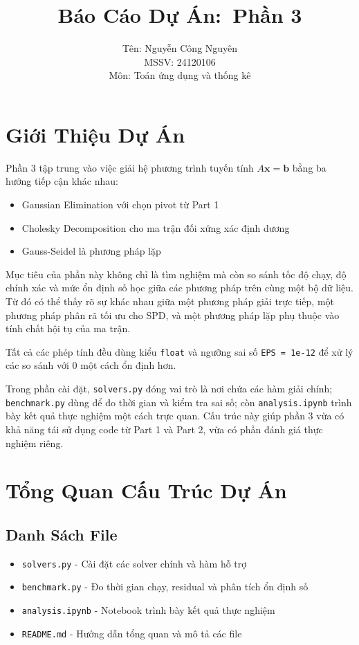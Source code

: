 \documentclass[12pt, a4paper, twoside]{article}
\title{\textbf{Báo Cáo Dự Án:\ \Huge Phần 3}}
\author{Tên: Nguyễn Công Nguyên\\MSSV: 24120106 \\Môn: Toán ứng dụng và thống kê}
\date{\vspace{-5mm}}
\begin{document}
\maketitle

\tableofcontents
\newpage

\section{Giới Thiệu Dự Án}

Phần 3 tập trung vào việc giải hệ phương trình tuyến tính $A\mathbf{x} = \mathbf{b}$ bằng ba hướng tiếp cận khác nhau:
\begin{itemize}
    \item Gaussian Elimination với chọn pivot từ Part 1
    \item Cholesky Decomposition cho ma trận đối xứng xác định dương
    \item Gauss-Seidel là phương pháp lặp
\end{itemize}

Mục tiêu của phần này không chỉ là tìm nghiệm mà còn so sánh tốc độ chạy, độ chính xác và mức ổn định số học giữa các phương pháp trên cùng một bộ dữ liệu. Từ đó có thể thấy rõ sự khác nhau giữa một phương pháp giải trực tiếp, một phương pháp phân rã tối ưu cho SPD, và một phương pháp lặp phụ thuộc vào tính chất hội tụ của ma trận.

Tất cả các phép tính đều dùng kiểu \texttt{float} và ngưỡng sai số \texttt{EPS = 1e-12} để xử lý các so sánh với 0 một cách ổn định hơn.

Trong phần cài đặt, \texttt{solvers.py} đóng vai trò là nơi chứa các hàm giải chính; \texttt{benchmark.py} dùng để đo thời gian và kiểm tra sai số; còn \texttt{analysis.ipynb} trình bày kết quả thực nghiệm một cách trực quan. Cấu trúc này giúp phần 3 vừa có khả năng tái sử dụng code từ Part 1 và Part 2, vừa có phần đánh giá thực nghiệm riêng.

\section{Tổng Quan Cấu Trúc Dự Án}

\subsection{Danh Sách File}
\begin{itemize}
    \item \texttt{solvers.py} - Cài đặt các solver chính và hàm hỗ trợ
    \item \texttt{benchmark.py} - Đo thời gian chạy, residual và phân tích ổn định số
    \item \texttt{analysis.ipynb} - Notebook trình bày kết quả thực nghiệm
    \item \texttt{README.md} - Hướng dẫn tổng quan và mô tả các file
\end{itemize}
\end{document}
